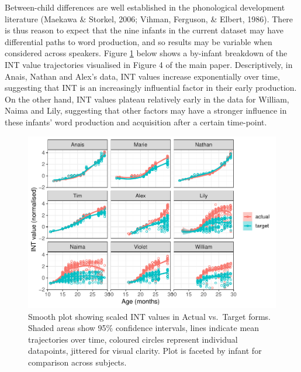 \documentclass[
  man,floatsintext]{apa6}
\begin{document}
Between-child differences are well established in the phonological development literature (Maekawa \& Storkel, 2006; Vihman, Ferguson, \& Elbert, 1986). There is thus reason to expect that the nine infants in the current dataset may have differential paths to word production, and so results may be variable when considered across speakers. Figure \ref{fig:by-speaker-data} below shows a by-infant breakdown of the INT value trajectories visualised in Figure 4 of the main paper. Descriptively, in Anais, Nathan and Alex's data, INT values increase exponentially over time, suggesting that INT is an increasingly influential factor in their early production. On the other hand, INT values plateau relatively early in the data for William, Naima and Lily, suggesting that other factors may have a stronger influence in these infants' word production and acquisition after a certain time-point.

\begin{figure}
\centering
\includegraphics{PhonNetworksSupplementaryData-test_files/figure-latex/by-speaker-data-1.pdf}
\caption{\label{fig:by-speaker-data}Smooth plot showing scaled INT values in Actual vs.~Target forms. Shaded areas show 95\% confidence intervals, lines indicate mean trajectories over time, coloured circles represent individual datapoints, jittered for visual clarity. Plot is faceted by infant for comparison across subjects.}
\end{figure}

\newpage
\end{document}
